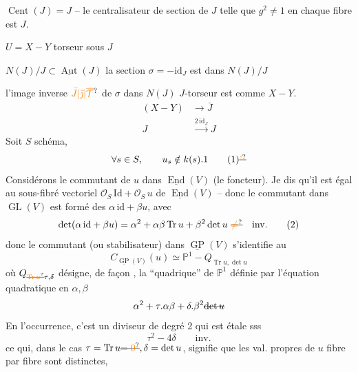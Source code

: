 $\operatorname{Cent}(J)=J$ -- le centralisateur de   section de $J$ telle que $g^2\ne1$ en chaque fibre est $J$.

$U=X-Y$ torseur sous $J$


 $N(J)/J\subset\underline{\operatorname{Aut}}(J)$  la section $\sigma=-\mathrm{id}_J$ est dans $N(J)/J$

  l'image inverse $\unsure{\bar J|\bar{\jmath}|\overline{\mathcal T}}$ de $\sigma$ dans $N(J)$    $J$-torseur  est comme $X-Y$.   
\[
\begin{aligned}
(X-Y)&\longrightarrow\bar J\\
J&\xrightarrow{2\,\mathrm{id}_J} J
\end{aligned}
\]
Soit $S$ schéma,  
\[
 \forall s\in S,\qquad u_s\notin k(s).1 \tag*{(1)\deleted{\unsure{'}}}
\]
Considérons le commutant de $u$ dans $\underline{\operatorname{End}}(V)$ (le foncteur). Je dis qu'il est égal au sous-fibré vectoriel $\mathcal O_S\,\mathrm{Id}+\mathcal O_S\,u$ de $\underline{\operatorname{End}}(V)$ -- donc le commutant dans $\operatorname{GL}(V)$ est formé des $\alpha\,\mathrm{id}+\beta u$, avec
\[
 \det(\alpha\,\mathrm{id}+\beta u)=\alpha^2+\alpha\beta\operatorname{Tr}u+\beta^2\det u\ \deleted{\unsure{\ne}}\quad\text{inv.} \tag*{(2)}
\]
donc le commutant (ou stabilisateur) dans $\underline{\operatorname{GP}}(V)$ s'identifie au
\[
 C_{\underline{\operatorname{GP}}(V)}(u)\simeq\mathbb P^1-Q_{\operatorname{Tr}u,\det u}
\]
où $Q_{\deleted{\unsure{\operatorname{Tr}u}}\tau,\delta}$ désigne, de façon , la ``quadrique'' de $\mathbb P^1$ définie par l'équation quadratique en $\alpha,\beta$
\[
 \alpha^2+\tau.\alpha\beta+\delta.\beta^2\deleted{\det u}
\]
En l'occurrence, c'est un diviseur de degré 2  qui est étale sss
\[
 \tau^2-4\delta\qquad\text{inv.}
\]
ce qui, dans le cas $\tau=\operatorname{Tr}u\deleted{\unsure{=0}},\delta=\det u$, signifie que les val. propres de $u$ fibre par fibre sont distinctes,
